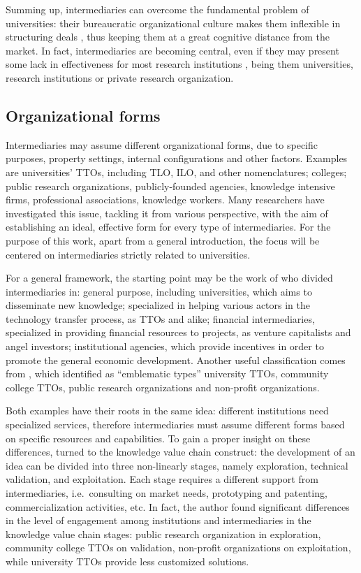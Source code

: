 Summing up, intermediaries can overcome the fundamental problem of universities: their bureaucratic organizational culture makes them inflexible in structuring deals \citep{Siegel2003a}, thus keeping them at a great cognitive distance from the market. In fact, intermediaries are becoming central, even if they may present some lack in effectiveness for most research institutions \citep{Geuna2009}, being them universities, research institutions or private research organization.

\subsection{Organizational forms}

Intermediaries may assume different organizational forms, due to specific purposes, property settings, internal configurations and other factors. Examples are universities' TTOs, including TLO, ILO, and other nomenclatures; colleges; public research organizations, publicly-founded agencies, knowledge intensive firms, professional associations, knowledge workers. Many researchers have investigated this issue, tackling it from various perspective, with the aim of establishing an ideal, effective form for every type of intermediaries. For the purpose of this work, apart from a general introduction, the focus will be centered on intermediaries strictly related to universities.

For a general framework, the starting point may be the work of \citet{Yusuf2008} who divided intermediaries in: general purpose, including universities, which aims to disseminate new knowledge; specialized in helping various actors in the technology transfer process, as TTOs and alike; financial intermediaries, specialized in providing financial resources to projects, as venture capitalists and angel investors; institutional agencies, which provide incentives in order to promote the general economic development. Another useful classification comes from \citet{Landry2013}, which identified as \enquote{emblematic types} university TTOs, community college TTOs, public research organizations and non-profit organizations.

Both examples have their roots in the same idea: different institutions need specialized services, therefore intermediaries must assume different forms based on specific resources and capabilities. To gain a proper insight on these differences, \citet{Landry2013} turned to the knowledge value chain construct: the development of an idea can be divided into three non-linearly stages, namely exploration, technical validation, and exploitation. Each stage requires a different support from intermediaries, i.e.\ consulting on market needs, prototyping and patenting, commercialization activities, etc. In fact, the author found significant differences in the level of engagement among institutions and intermediaries in the knowledge value chain stages: public research organization in exploration, community college TTOs on validation, non-profit organizations on exploitation, while university TTOs provide less customized solutions.

